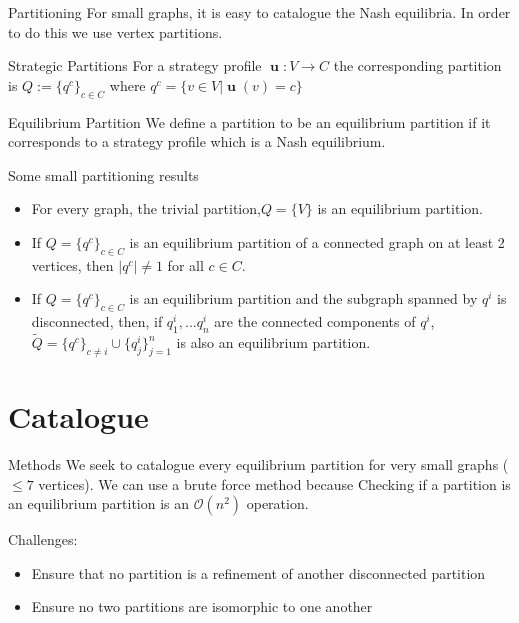 \documentclass{beamer}
\DeclareMathOperator{\uu}{\mathbf{u}}
\begin{document}
\begin{frame}{Partitioning}
	For small graphs, it is easy to catalogue the Nash equilibria. In order to do this we use vertex partitions.  
	\begin{block}{Strategic Partitions}
		For a strategy profile $\uu:V\rightarrow C$ the corresponding partition is $Q:=\{q^c\}_{c\in C}$ where $q^c=\{v\in V|\uu(v)=c\}$
	\end{block}  
	\begin{block}{Equilibrium Partition}
		We define a partition to be an equilibrium partition if it corresponds to a strategy profile which is a Nash equilibrium. 
	\end{block}
\end{frame}
\begin{frame}{Some small partitioning results}
	\begin{itemize}
		\item For every graph, the trivial partition,$Q=\{V\}$ is an equilibrium partition.
		\item If $Q=\{q^c\}_{c\in C}$ is an equilibrium partition of a connected graph on at least 2 vertices, then $|q^c|\neq 1$ for all $c\in C$. 
		\item If $Q=\{q^c\}_{c\in C}$ is an equilibrium partition and the subgraph spanned by $q^i$ is disconnected, then, if $q^i_1,...q^i_n$ are the connected components of $q^i$, $\tilde{Q}=\{q^c\}_{c\neq i}\cup \{q^i_j\}_{j=1}^n$ is also an equilibrium partition. 
	\end{itemize}
\end{frame}

\section{Catalogue}
\begin{frame}{Methods}
	We seek to catalogue every equilibrium partition for very small graphs ($\leq 7$ vertices). We can use a brute force method because Checking if a partition is an equilibrium partition is an $\mathcal{O}(n^2)$ operation. 
	
	Challenges:
	\begin{itemize}
		\item Ensure that no partition is a refinement of another disconnected partition
		\item Ensure no two partitions are isomorphic to one another
	\end{itemize}
\end{frame}
\end{document}
